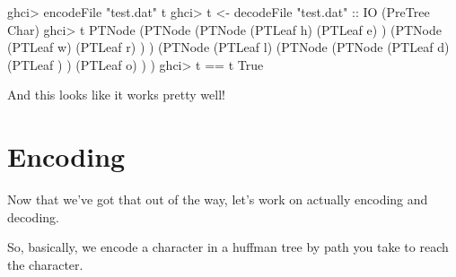 \documentclass[]{article}
\newenvironment{Shaded}{}{}
\newcommand{\CharTok}[1]{\textcolor[rgb]{0.25,0.44,0.63}{#1}}
\newcommand{\DataTypeTok}[1]{\textcolor[rgb]{0.56,0.13,0.00}{#1}}
\newcommand{\NormalTok}[1]{#1}
\newcommand{\OperatorTok}[1]{\textcolor[rgb]{0.40,0.40,0.40}{#1}}
\newcommand{\OtherTok}[1]{\textcolor[rgb]{0.00,0.44,0.13}{#1}}
\newcommand{\StringTok}[1]{\textcolor[rgb]{0.25,0.44,0.63}{#1}}
\begin{document}
\begin{Shaded}
\begin{Highlighting}[]
\NormalTok{ghci}\OperatorTok{>}\NormalTok{ encodeFile }\StringTok{"test.dat"}\NormalTok{ t}
\NormalTok{ghci}\OperatorTok{>}\NormalTok{ t\textquotesingle{} }\OtherTok{<{-}}\NormalTok{ decodeFile }\StringTok{"test.dat"}\OtherTok{ ::} \DataTypeTok{IO}\NormalTok{ (}\DataTypeTok{PreTree} \DataTypeTok{Char}\NormalTok{)}
\NormalTok{ghci}\OperatorTok{>}\NormalTok{ t\textquotesingle{}}
\DataTypeTok{PTNode}\NormalTok{ (}\DataTypeTok{PTNode}\NormalTok{ (}\DataTypeTok{PTNode}\NormalTok{ (}\DataTypeTok{PTLeaf} \CharTok{\textquotesingle{}h\textquotesingle{}}\NormalTok{)}
\NormalTok{                       (}\DataTypeTok{PTLeaf} \CharTok{\textquotesingle{}e\textquotesingle{}}\NormalTok{)}
\NormalTok{               )}
\NormalTok{               (}\DataTypeTok{PTNode}\NormalTok{ (}\DataTypeTok{PTLeaf} \CharTok{\textquotesingle{}w\textquotesingle{}}\NormalTok{)}
\NormalTok{                       (}\DataTypeTok{PTLeaf} \CharTok{\textquotesingle{}r\textquotesingle{}}\NormalTok{)}
\NormalTok{               )}
\NormalTok{       )}
\NormalTok{       (}\DataTypeTok{PTNode}\NormalTok{ (}\DataTypeTok{PTLeaf} \CharTok{\textquotesingle{}l\textquotesingle{}}\NormalTok{)}
\NormalTok{               (}\DataTypeTok{PTNode}\NormalTok{ (}\DataTypeTok{PTNode}\NormalTok{ (}\DataTypeTok{PTLeaf} \CharTok{\textquotesingle{}d\textquotesingle{}}\NormalTok{)}
\NormalTok{                               (}\DataTypeTok{PTLeaf} \CharTok{\textquotesingle{} \textquotesingle{}}\NormalTok{)}
\NormalTok{                       )}
\NormalTok{                       (}\DataTypeTok{PTLeaf} \CharTok{\textquotesingle{}o\textquotesingle{}}\NormalTok{)}
\NormalTok{               )}
\NormalTok{       )}
\NormalTok{ghci}\OperatorTok{>}\NormalTok{ t\textquotesingle{} }\OperatorTok{==}\NormalTok{ t}
\DataTypeTok{True}
\end{Highlighting}
\end{Shaded}

And this looks like it works pretty well!

\hypertarget{encoding}{%
\section{Encoding}\label{encoding}}

Now that we've got that out of the way, let's work on actually encoding and
decoding.

So, basically, we encode a character in a huffman tree by path you take to reach
the character.
\end{document}
